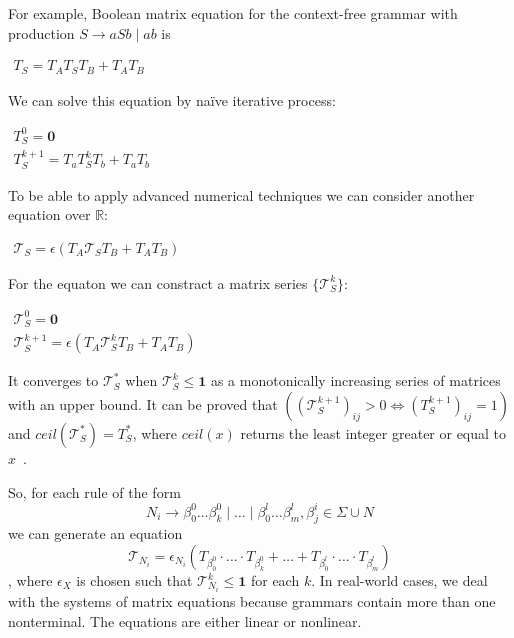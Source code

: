 \documentclass[sigconf]{acmart}
\begin{document}
For example, Boolean matrix equation for the context-free grammar with production $S \rightarrow aSb \mid ab$ is
\begin{center}
\(
\left.
\begin{array}{l}
T_S = T_AT_ST_B + T_AT_B
\end{array}
\right.
\)
\end{center}

We can solve this equation by na\"ive iterative process:
\begin{center}
\(
\left.
\begin{array}{l}
T_S^0 = \mathbf{0} \\
T_S^{k+1} = T_a T_S^k T_b + T_a T_b
\end{array}
\right.
\)
\end{center}

To be able to apply advanced numerical techniques we can consider another equation over $\mathbb{R}$:

\begin{center}
\(
\left.
\begin{array}{l}
\mathcal{T}_S = \epsilon(T_A \mathcal{T}_S T_B + T_A T_B)
\end{array}
\right.
\)
\end{center}

For the equaton we can constract a matrix series $\{ \mathcal{T}_S^{k}\}$:

\begin{center}
\(
\left.
\begin{array}{c}
\mathcal{T}_S^0 = \mathbf{0} \\
\mathcal{T}_S^{k+1} = \epsilon(T_A \mathcal{T}_S^k T_B + T_A T_B)
\end{array}
\right.
\)
\end{center}

It converges to $\mathcal{T}_S^*$ when $\mathcal{T}_S^{k} \leq \textbf{1}$ as a monotonically increasing series of matrices with an upper bound.
It can be proved that $((\mathcal{T}_S^{k+1})_{ij} > 0 \iff (T_S^{k+1})_{ij} = 1)$ and $ceil(\mathcal{T}_S^*) = T_S^*$, where $ceil(x)$ returns the least integer greater or equal to $x$~\cite{sato2017linear}.

So, for each rule of the form $$N_i \to \beta^0_0 \dots \beta^0_k \mid \ldots \mid \beta^l_0 \dots \beta^l_m, \beta^i_j \in \Sigma \cup N$$ we can generate an equation
$$\mathcal{T}_{N_i} = \epsilon_{N_i}(T_{\beta^0_0}\cdot \ldots \cdot T_{\beta^0_k} + \ldots + T_{\beta^l_0}\cdot \ldots \cdot T_{\beta^l_m}) $$, where $\epsilon_X$ is chosen such that $\mathcal{T}_{N_i}^{k} \leq \textbf{1}$ for each $k$.
In real-world cases, we deal with the systems of matrix equations because grammars contain more than one nonterminal.
The equations are either linear or nonlinear.
\end{document}
